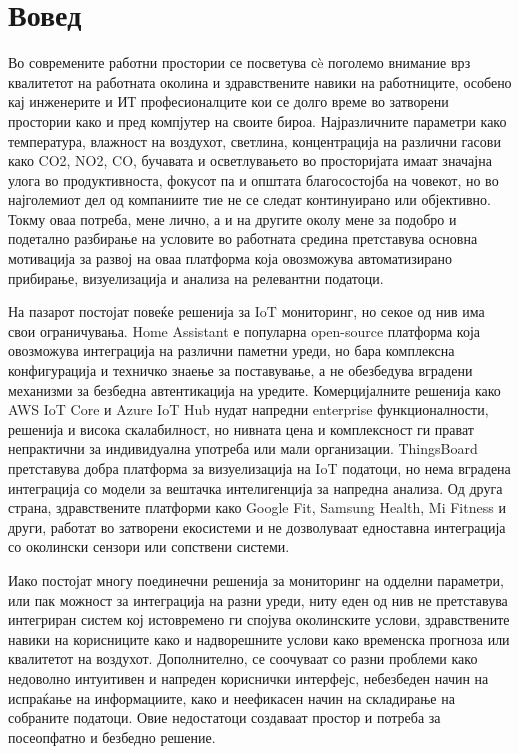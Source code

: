 \newpage
{}
\setcounter{page}{1}

\section{Вовед}

Во современите работни простории се посветува сè поголемо внимание врз
квалитетот на работната околина и здравствените навики на работниците,
особено кај инженерите и ИТ професионалците кои се долго време во
затворени простории како и пред компјутер на своите бироа. Најразличните
параметри како температура, влажност на воздухот, светлина,
концентрација на различни гасови како CO2, NO2, CO, бучавата и
осветлувањето во просторијата имаат значајна улога во продуктивноста,
фокусот па и општата благосостојба на човекот, но во најголемиот дел од
компаниите тие не се следат континуирано или објективно. Токму оваа
потреба, мене лично, а и на другите околу мене за подобро и подетално
разбирање на условите во работната средина претставува основна
мотивација за развој на оваа платформа која овозможува автоматизирано
прибирање, визуелизација и анализа на релевантни податоци.

На пазарот постојат повеќе решенија за IoT мониторинг, но секое од нив
има свои ограничувања. Home Assistant е популарна open-source платформа
која овозможува интеграција на различни паметни уреди, но бара
комплексна конфигурација и техничко знаење за поставување, а не
обезбедува вградени механизми за безбедна автентикација на уредите.
Комерцијалните решенија како AWS IoT Core и Azure IoT Hub нудат напредни
enterprise функционалности, решенија и висока скалабилност, но нивната
цена и комплексност ги прават непрактични за индивидуална употреба или
мали организации. ThingsBoard претставува добра платформа за
визуелизација на IoT податоци, но нема вградена интеграција со модели за
вештачка интелигенција за напредна анализа. Од друга страна,
здравствените платформи како Google Fit, Samsung Health, Mi Fitness и
други, работат во затворени екосистеми и не дозволуваат едноставна
интеграција со околински сензори или сопствени системи.

Иако постојат многу поединечни решенија за мониторинг на одделни
параметри, или пак можност за интеграција на разни уреди, ниту еден од
нив не претставува интегриран систем кој истовремено ги спојува
околинските услови, здравствените навики на корисниците како и
надворешните услови како временска прогноза или квалитетот на воздухот.
Дополнително, се соочуваат со разни проблеми како недоволно интуитивен и
напреден кориснички интерфејс, небезбеден начин на испраќање на
информациите, како и неефикасен начин на складирање на собраните
податоци. Овие недостатоци создаваат простор и потреба за посеопфатно и
безбедно решение.

